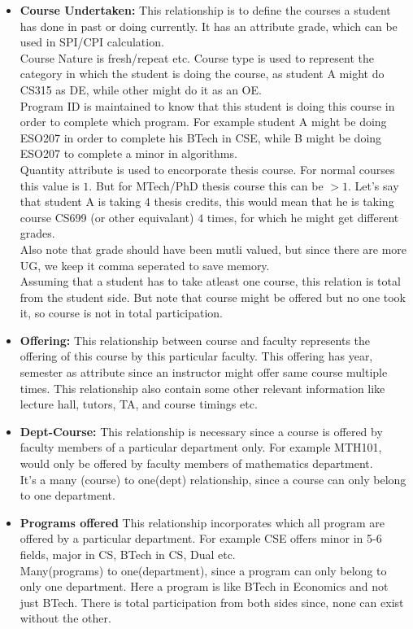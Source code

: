 \documentclass[a4paper]{article}
\begin{document}
\begin{itemize}
	\item{\textbf{Course Undertaken:}} This relationship is to define the courses a student has done
	in past or doing currently. It has an attribute grade, which can be used in SPI/CPI calculation.\\
	Course Nature is fresh/repeat etc. Course type is used to represent the category in which the student is doing the course,
	as student A might do CS315 as DE, while other might do it as an OE.\\
	Program ID is maintained to know that this student is doing this course in order to complete which program.
	For example student A might be doing ESO207 in order to complete his BTech in CSE, while B might be doing
	ESO207 to complete a minor in algorithms. \\
	Quantity attribute is used to encorporate thesis course. For normal courses this value is $1$.
	But for MTech/PhD thesis course this can be $>1$. Let's say that student A is taking $4$ thesis credits, this would mean
	that he is taking course CS699 (or other equivalant) $4$ times, for which he might get different grades. \\
	Also note that grade should have been mutli valued, but since there are more UG, we keep it comma seperated to save memory. \\

	Assuming that a student has to take atleast one course, this relation is total from the student side.
	But note that course might be offered but no one took it, so course is not in total participation. 

	\item{\textbf{Offering:}} This relationship between course and faculty represents the offering of this
	course by this particular faculty. This offering has year, semester as attribute since an instructor might
	offer same course multiple times. This relationship also contain some other relevant information like lecture hall,
	tutors, TA, and course timings etc. 

	\item{\textbf{Dept-Course:}} This relationship is necessary since a course is offered by faculty members
	of a particular department only. For example MTH101, would only be offered by faculty members of mathematics department.
	\\
	It's a many (course) to one(dept) relationship, since a course can only belong to one department.


	\item{\textbf{Programs offered}} This relationship incorporates which all program are offered by a
	particular department. For example CSE offers minor in 5-6 fields, major in CS, BTech in CS, Dual etc.\\
	Many(programs) to one(department), since a program can only belong to only one department. Here a program is like BTech in Economics and not just BTech. There is total participation from both sides since, none can exist without the other.


\end{itemize}
\end{document}
